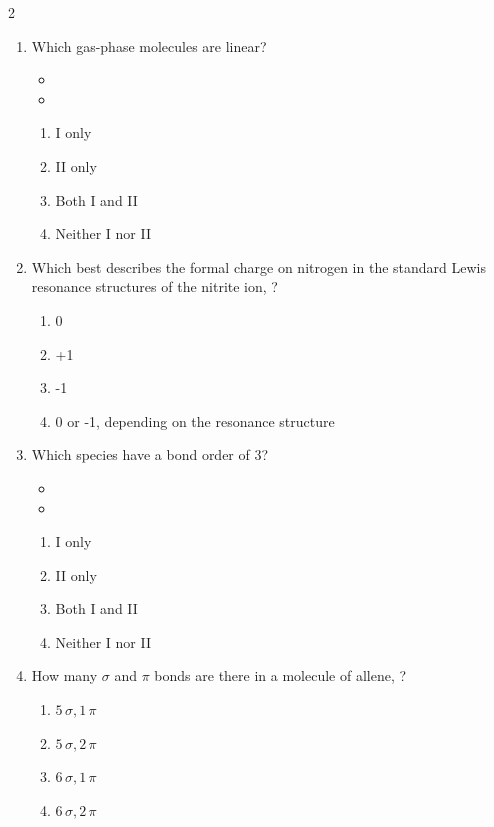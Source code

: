 \documentclass[10pt,letterpaper]{article}
\begin{document}
\begin{multicols*}{2}
\begin{enumerate}
    \item Which gas-phase molecules are linear?
    \begin{itemize}
        \item[I.] 
        \item[II.] 
    \end{itemize}
    \begin{enumerate}[label=(\textsubscript{\Alph*})]
        \item I only
        \item II only
        \item Both I and II
        \item Neither I nor II
    \end{enumerate}

    \item Which best describes the formal charge on nitrogen in the standard Lewis resonance structures of the nitrite ion, ?
    \begin{enumerate}[label=(\textsubscript{\Alph*})]
        \item 0
        \item +1
        \item -1
        \item 0 or -1, depending on the resonance structure
    \end{enumerate}

    \item Which species have a bond order of 3?
    \begin{itemize}
        \item[I.] 
        \item[II.] 
    \end{itemize}
    \begin{enumerate}[label=(\textsubscript{\Alph*})]
        \item I only
        \item II only
        \item Both I and II
        \item Neither I nor II
    \end{enumerate}

    \item How many $\sigma$ and $\pi$ bonds are there in a molecule of allene, ?
    \begin{enumerate}[label=(\textsubscript{\Alph*})]
        \item $5\,\sigma, 1\,\pi$
        \item $5\,\sigma, 2\,\pi$
        \item $6\,\sigma, 1\,\pi$
        \item $6\,\sigma, 2\,\pi$
    \end{enumerate}


\end{enumerate}
\end{multicols*}
\end{document}

